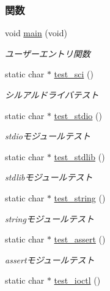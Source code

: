 \subsubsection*{関数}
\begin{DoxyCompactItemize}
\item 
void \hyperlink{test_8h_a6288eba0f8e8ad3ab1544ad731eb7667_a6288eba0f8e8ad3ab1544ad731eb7667}{main} (void)
\begin{DoxyCompactList}\small\item\em ユーザーエントリ関数 \end{DoxyCompactList}\item 
static char $\ast$ \hyperlink{test_8h_aa0788b0471ba5280e8f26585f5963d1b_aa0788b0471ba5280e8f26585f5963d1b}{test\+\_\+sci} ()
\begin{DoxyCompactList}\small\item\em シルアルドライバテスト \end{DoxyCompactList}\item 
static char $\ast$ \hyperlink{test_8h_a61cf385a427a8b54117135ece9266ae7_a61cf385a427a8b54117135ece9266ae7}{test\+\_\+stdio} ()
\begin{DoxyCompactList}\small\item\em stdioモジュールテスト \end{DoxyCompactList}\item 
static char $\ast$ \hyperlink{test_8h_af086b0dcce5bab007fee47e1793bf0d4_af086b0dcce5bab007fee47e1793bf0d4}{test\+\_\+stdlib} ()
\begin{DoxyCompactList}\small\item\em stdlibモジュールテスト \end{DoxyCompactList}\item 
static char $\ast$ \hyperlink{test_8h_a601f526180e9f9e0a07e0e4c4e448d35_a601f526180e9f9e0a07e0e4c4e448d35}{test\+\_\+string} ()
\begin{DoxyCompactList}\small\item\em stringモジュールテスト \end{DoxyCompactList}\item 
static char $\ast$ \hyperlink{test_8h_a8cb2e931c1f097d0256c2298d745435e_a8cb2e931c1f097d0256c2298d745435e}{test\+\_\+assert} ()
\begin{DoxyCompactList}\small\item\em assertモジュールテスト \end{DoxyCompactList}\item 
static char $\ast$ \hyperlink{test_8h_a0efc2b36ae8892928aac1e39b1ac9fa6_a0efc2b36ae8892928aac1e39b1ac9fa6}{test\+\_\+ioctl} ()

\end{DoxyCompactItemize}
